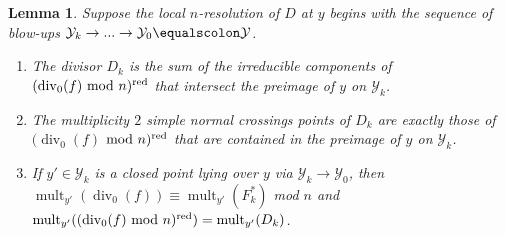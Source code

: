 \documentclass[12pt]{amsart}
\numberwithin{equation}{section}
\newtheorem{lemma}[equation]{Lemma}
\theoremstyle{definition}
\newcommand{\Y}{\mathcal{Y}}
\DeclareMathOperator{\divi}{div}
\DeclareMathOperator{\red}{red}
\DeclareMathOperator{\mult}{mult}
\begin{document}
\begin{lemma}\label{lemma: multiplicity in div_0(f)}
    Suppose the local $n$-resolution of $D$ at $y$ begins with the sequence of blow-ups $\Y_k\to...\to\Y_0\equalscolon\Y$.
    \begin{enumerate}[\upshape (i)]
        \item The divisor $D_k$ is the sum of the irreducible components of $(\divi_0(f)\textup{ mod }n)^{\red}$ that intersect the preimage of $y$ on $\Y_k$.
        \item The multiplicity $2$ simple normal crossings points of $D_k$ are exactly those of $(\divi_0(f)$ $\textup{mod }n)^{\red}$ that are contained in the preimage of $y$ on $\Y_k$.
        \item If $y'\in\Y_k$ is a closed point lying over $y$ via $\Y_k\to\Y_0$, then $\mult_{y'}(\divi_0(f))\equiv \mult_{y'}(F_k^*)$ \textup{mod} $n$ and $\mult_{y'}((\divi_0(f)\textup{ mod }n)^{\red})=\mult_{y'}(D_k)$.
    \end{enumerate}
\end{lemma}
\end{document}
